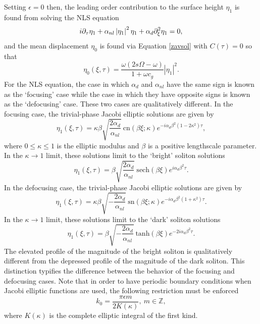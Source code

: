 \documentclass{JFM_Style/jfm}
\begin{document}
Setting $\epsilon=0$ then, the leading order contribution to the surface height $\eta_{1}$ is found from solving the NLS equation
\[
i\partial_{\tau}\eta_{1} + \alpha_{nl}\left|\eta_{1}\right|^{2}\eta_{1} + \alpha_{d}\partial_{\xi}^{2}\eta_{1} = 0,
\]
and the mean displacement $\eta_{0}$ is found via Equation \eqref{zavsol} with $C(\tau)=0$ so that
\begin{equation}
\eta_{0}(\xi,\tau) = \frac{\omega(2s\Omega-\omega)}{1+\omega c_{g}}\left|\eta_{1}\right|^{2}.
\label{meansurf}
\end{equation}
For the NLS equation, the case in which $\alpha_{d}$ and $\alpha_{nl}$ have the same sign is known as the `focusing' case while the case in which they have opposite signs is known as the `defocusing' case.  These two cases are qualitatively different.  In the focusing case, the trivial-phase Jacobi elliptic solutions are given by
\begin{equation}
\eta_{1}(\xi,\tau) = \kappa\beta \sqrt{\frac{2\alpha_{d}}{\alpha_{nl}}}~\mbox{cn}(\beta \xi;\kappa)e^{-i\alpha_{d}\beta^{2}(1-2\kappa^2)\tau},
\label{cnsolns}
\end{equation}
where $0\le\kappa\le1$ is the elliptic modulus and $\beta$ is a positive lengthscale parameter.  In the $\kappa \rightarrow 1$ limit, these solutions limit to the `bright' soliton solutions
\[
\eta_{1}(\xi,\tau)=\beta \sqrt{\frac{2\alpha_{d}}{\alpha_{nl}}}~\mbox{sech}(\beta \xi)e^{i\alpha_{d}\beta^{2}\tau}.
\]
In the defocusing case, the trivial-phase Jacobi elliptic solutions are given by 
\begin{equation}
\eta_{1}(\xi,\tau) = \kappa\beta \sqrt{-\frac{2\alpha_{d}}{\alpha_{nl}}}~\mbox{sn}(\beta \xi;\kappa) e^{-i\alpha_{d}\beta^{2}(1+\kappa^2)\tau}.
\label{snsolns}
\end{equation}
In the $\kappa\rightarrow1$ limit, these solutions limit to the `dark'
soliton solutions
\[
\eta_{1}(\xi,\tau)=\beta \sqrt{-\frac{2\alpha_{d}}{\alpha_{nl}}}~ \mbox{tanh}(\beta \xi)  e^{-2i\alpha_{d}\beta^{2}\tau}.
\] 
The elevated profile of the magnitude of the bright soliton is qualitatively different from the depressed profile of the magnitude of the dark soliton.  This distinction typifies the difference between the behavior of the focusing and defocusing cases.  Note that in order to have periodic boundary conditions when Jacobi elliptic functions are used, the following restriction must be enforced
\begin{equation}
k_{0} = \frac{\pi \epsilon m}{2K(\kappa)},~ m\in \mathbb{Z},
\label{jacwavnum}
\end{equation}
where $K(\kappa)$ is the complete elliptic integral of the first kind.   
\end{document}
